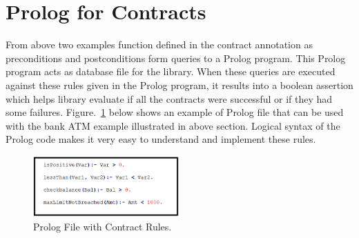 \section{Prolog for Contracts}
From above two examples function defined in the contract annotation as preconditions and postconditions form queries to a Prolog program. This Prolog program acts as database file for the library. When these queries are executed against these rules given in the Prolog program, it results into a boolean assertion which helps library evaluate if all the contracts were successful or if they had some failures.   
Figure.~\ref{fig:PrologProgram} below shows an example of Prolog file that can be used with the bank ATM example illustrated in above section. Logical syntax of the Prolog code makes it very easy to understand and implement these rules.

\begin{figure}[htb]
\centering
\includegraphics[width=0.5\textwidth]{images/PrologDatabase.PNG}
\caption{Prolog File with Contract Rules.} 
\label{fig:PrologProgram}
\end{figure} 